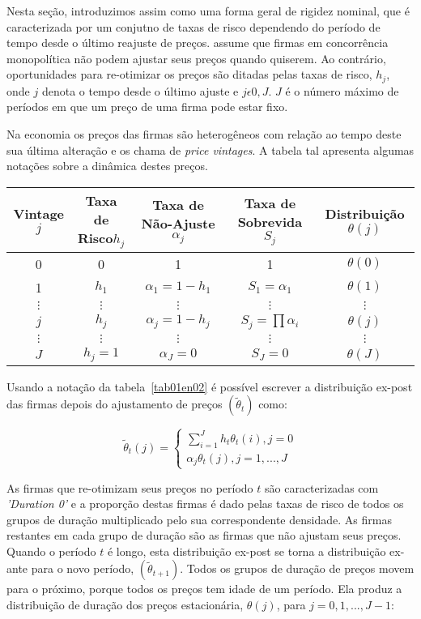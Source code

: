 \documentclass[twoside,a4paper,11pt]{report}
\begin{document}
Nesta seção, introduzimos assim como \citet{yao2010aggregate} uma forma geral de rigidez nominal, que é caracterizada por um conjutno de taxas de risco dependendo do período de tempo desde o último reajuste de preços. \citet{yao2010aggregate} assume que firmas em concorrência monopolítica não podem ajustar seus preços quando quiserem. Ao contrário, oportunidades para re-otimizar os preços são ditadas pelas taxas de risco, $h_{j}$, onde $j$ denota o tempo desde o último ajuste e $j\epsilon {0,J}$. $J$ é o número máximo de períodos em que um preço de uma firma pode estar fixo. 

Na economia os preços das firmas são heterogêneos com relação ao tempo deste sua última alteração e \citet{yao2010aggregate} os chama de \emph{price vintages}. A tabela tal apresenta algumas notações sobre a dinâmica destes preços. 

\begin{center}\label{tab01en02}
  \begin{tabular}{|c|c|c|c|c|}
    \hline 
    Vintage$j$ & Taxa de Risco$h_{j}$ & Taxa de Não-Ajuste $\alpha_{j}$ & Taxa de Sobrevida $S_{j}$ & Distribuição $\theta(j)$\tabularnewline
    \hline 
    0 & 0 & 1 & 1 & $\theta(0)$\tabularnewline
    \hline 
    1 & $h_{1}$ & $\alpha_{1}=1-h_{1}$ & $S_{1}=\alpha_{1}$ & $\theta(1)$\tabularnewline
    \hline 
    $\vdots$ & $\vdots$ & $\vdots$ & $\vdots$ & $\vdots$\tabularnewline
    \hline 
    $j$ & $h_{j}$ & $\alpha_{j}=1-h_{j}$ & $S_{j}=\prod\alpha_{i}$ & $\theta(j)$\tabularnewline
    \hline 
    $\vdots$ & $\vdots$ & $\vdots$ & $\vdots$ & $\vdots$\tabularnewline
    \hline 
    $J$ & $h_{j}=1$ & $\alpha_{J}=0$ & $S_{J}=0$ & $\theta(J)$\tabularnewline
    \hline 
  \end{tabular}
\end{center}

Usando a notação da tabela~\ref{tab01en02} é possível escrever a distribuição ex-post das firmas depois do ajustamento de preços $({\tilde{\theta}}_{t})$ como:

\begin{equation}\label{eq13en02}
{\tilde{\theta}}_{t}(j)=\begin{cases} \sum _{i=1}^{J}{{h}_{t}{\theta}_{t}(i)} ,j=0 \\ {\alpha}_{j}{\theta}_{t}(j),j=1,...,J \end{cases}
\end{equation}

As firmas que re-otimizam seus preços no período $t$ são caracterizadas com \emph{'Duration 0'} e a proporção destas firmas é dado pelas taxas de risco de todos os grupos de duração multiplicado pelo sua correspondente densidade. As firmas restantes em cada grupo de duração são as firmas que não ajustam seus preços. Quando o período $t$ é longo, esta distribuição ex-post se torna a distribuição ex-ante para o novo período, $({\tilde{\theta}}_{t+1})$. Todos os grupos de duração de preços movem para o próximo, porque todos os preços tem idade de um período. Ela produz a distribuição de duração dos preços estacionária, ${\theta}(j)$, para $j=0,1,...,J-1$:
\end{document}
